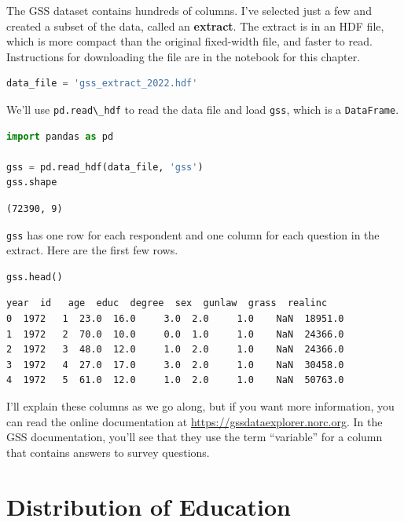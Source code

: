 The GSS dataset contains hundreds of columns. I've selected just a few
and created a subset of the data, called an \textbf{extract}. The
extract is in an HDF file, which is more compact than the original
fixed-width file, and faster to read. Instructions for downloading the
file are in the notebook for this chapter.

\begin{lstlisting}[language=Python,style=source]
data_file = 'gss_extract_2022.hdf'
\end{lstlisting}

We'll use \passthrough{\lstinline!pd.read\_hdf!} to read the data file
and load \passthrough{\lstinline!gss!}, which is a
\passthrough{\lstinline!DataFrame!}.

\begin{lstlisting}[language=Python,style=source]
import pandas as pd

gss = pd.read_hdf(data_file, 'gss')
gss.shape
\end{lstlisting}

\begin{lstlisting}[style=output]
(72390, 9)
\end{lstlisting}

\passthrough{\lstinline!gss!} has one row for each respondent and one
column for each question in the extract. Here are the first few rows.

\begin{lstlisting}[language=Python,style=source]
gss.head()
\end{lstlisting}

\begin{lstlisting}[style=output]
   year  id   age  educ  degree  sex  gunlaw  grass  realinc
0  1972   1  23.0  16.0     3.0  2.0     1.0    NaN  18951.0
1  1972   2  70.0  10.0     0.0  1.0     1.0    NaN  24366.0
2  1972   3  48.0  12.0     1.0  2.0     1.0    NaN  24366.0
3  1972   4  27.0  17.0     3.0  2.0     1.0    NaN  30458.0
4  1972   5  61.0  12.0     1.0  2.0     1.0    NaN  50763.0
\end{lstlisting}

I'll explain these columns as we go along, but if you want more
information, you can read the online documentation at
\url{https://gssdataexplorer.norc.org}. In the GSS documentation, you'll
see that they use the term ``variable'' for a column that contains
answers to survey questions.

\hypertarget{distribution-of-education}{%
\section{Distribution of Education}\label{distribution-of-education}}

